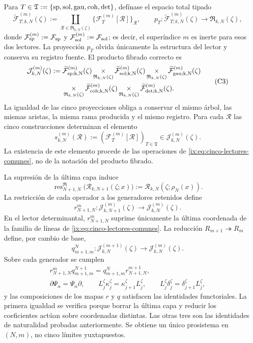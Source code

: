 Para
\(T\in\mathfrak T:=\{{\rm sp},{\rm sol},{\rm gau},{\rm coh},{\rm det}\}\),
defínase el espacio total tipado
\[
 \widetilde{\mathcal F}_{T;k,N}^{(m)}(\zeta)
 :=\coprod_{\mathscr R\in\mathfrak R_{k,N}(\zeta)}
   \{\mathcal F_T^{(m)}[\mathscr R]\}_{\mathscr R},
 \qquad
 p_T:\widetilde{\mathcal F}_{T;k,N}^{(m)}(\zeta)
      \longrightarrow\mathfrak R_{k,N}(\zeta),
\]
donde
\(\mathcal F_{\rm sp}^{(m)}:=\mathcal F_{\rm sp}\) y
\(\mathcal F_{\rm sol}^{(m)}:=\mathcal F_{\rm sol}\); es decir, el
superíndice \(m\) es inerte para esos dos lectores.
La proyección \(p_T\) olvida únicamente la estructura del lector y conserva
su registro fuente. El producto fibrado correcto es
\[
\begin{aligned}
 \mathcal J_{k,N}^{(m)}(\zeta):={}&
 \widetilde{\mathcal F}_{\rm sp;k,N}^{(m)}(\zeta)
 \mathop{\times}_{\mathfrak R_{k,N}(\zeta)}
 \widetilde{\mathcal F}_{\rm sol;k,N}^{(m)}(\zeta)
 \mathop{\times}_{\mathfrak R_{k,N}(\zeta)}
 \widetilde{\mathcal F}_{\rm gau;k,N}^{(m)}(\zeta)\\
 &\mathop{\times}_{\mathfrak R_{k,N}(\zeta)}
 \widetilde{\mathcal F}_{\rm coh;k,N}^{(m)}(\zeta)
 \mathop{\times}_{\mathfrak R_{k,N}(\zeta)}
 \widetilde{\mathcal F}_{\rm det;k,N}^{(m)}(\zeta).
\end{aligned}
\tag{C3}
\label{ix:eq:constructor-correlativo}
\]
La igualdad de las cinco proyecciones obliga a conservar el mismo árbol, las
mismas aristas, la misma rama producida y el mismo registro. Para cada
\(\mathscr R\) las cinco construcciones determinan el elemento
\[
 s_{k,N}^{(m)}(\mathscr R)
 :=(\mathcal F_T^{(m)}[\mathscr R])_{T\in\mathfrak T}
 \in\mathcal J_{k,N}^{(m)}(\zeta).
\]
La existencia de este elemento procede de las operaciones de
\eqref{ix:eq:cinco-lectores-comunes}, no de la
notación del producto fibrado.

La supresión de la última capa induce
\[
 \operatorname{res}^{\mathfrak R}_{N+1,N}
 \bigl(\mathscr R_{k,N+1}(\zeta;x)\bigr)
 :=\mathscr R_{k,N}(\zeta;\rho_N(x)).
\]
La restricción de cada operador a los generadores retenidos define
\[
 r^m_{N+1,N}:\mathcal J_{k,N+1}^{(m)}(\zeta)
 \longrightarrow\mathcal J_{k,N}^{(m)}(\zeta).
\]
En el lector determinantal, \(r^m_{N+1,N}\) suprime únicamente la última
coordenada de la familia de líneas de
\eqref{ix:eq:cinco-lectores-comunes}. La reducción
\(R_{m+1}\twoheadrightarrow R_m\) define, por cambio de base,
\[
 q^N_{m+1,m}:\mathcal J_{k,N}^{(m+1)}(\zeta)
 \longrightarrow\mathcal J_{k,N}^{(m)}(\zeta).
\]
Sobre cada generador se cumplen
\[
\begin{gathered}
 r^m_{N+1,N}q^{N+1}_{m+1,m}
 =q^N_{m+1,m}r^{m+1}_{N+1,N},\\
 \partial\Psi_\alpha=\Psi_\alpha\partial,
 \qquad L_j^\zeta\kappa_j^\zeta
       =\kappa_{j+1}^\zeta L_j^\zeta,
 \qquad L_j^\zeta\delta_j^\zeta
       =\delta_{j+1}^\zeta L_j^\zeta,
\end{gathered}
\tag{C4}
\label{ix:eq:naturalidad-D}
\]
y las composiciones de los mapas \(r\) y \(q\) satisfacen las identidades
functoriales. La primera igualdad se verifica porque borrar la última capa y
reducir los coeficientes actúan sobre coordenadas distintas. Las otras tres
son las identidades de naturalidad probadas anteriormente. Se obtiene un único
prosistema en \((N,m)\), no cinco límites yuxtapuestos.

